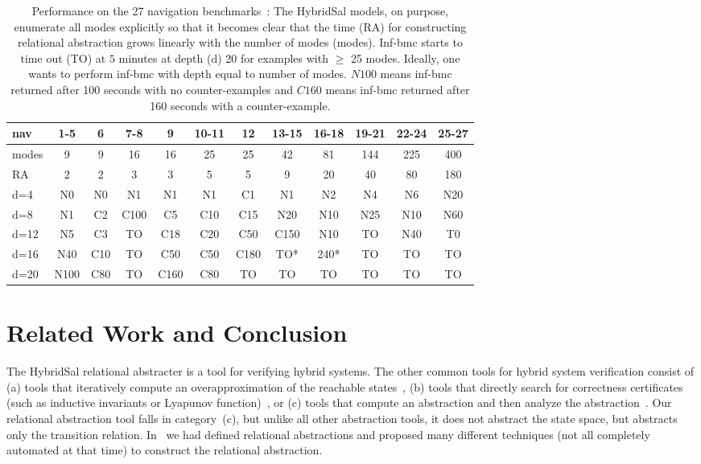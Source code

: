 \documentclass{llncs}
\begin{document}
\begin{table}[t]
\begin{center}
\small{
\begin{tabular}{||l|c|c|c|c|c|c|c|c|c|c|c||}
\hline
 nav & 1-5 & 6 & 7-8 & 9 & 10-11 & 12 & 13-15 & 16-18 & 19-21 & 22-24 & 25-27
\\ \hline \hline
modes & 9 & 9 & 16 & 16 & 25 & 25 & 42 & 81 & 144 & 225 & 400
\\
RA & 2 & 2 & 3 & 3 & 5 & 5 & 9 & 20 & 40 & 80 & 180
\\
d=4 & N0 & N0 & N1 & N1 & N1 & C1 & N1 & N2 & N4 & N6 & N20
\\
d=8 & N1 & C2 & C100 & C5 & C10 & C15 & N20 & N10 & N25 & N10 & N60
\\
d=12 & N5 & C3 & TO & C18 & C20 & C50 & C150 & N10 & TO & N40 & T0
\\
d=16 & N40 & C10 & TO & C50 & C50 & C180 & TO* & 240* & TO & TO & TO
\\
d=20 & N100 & C80 & TO & C160 & C80 & TO & TO & TO & TO & TO & TO
\\
\hline
\end{tabular}
}
\end{center}
\caption{Performance on the 27 navigation benchmarks~\cite{benchmarks}: The HybridSal
models, on purpose, enumerate all modes explicitly so that it
becomes clear that the time (RA) for constructing
relational abstraction grows linearly with the number of modes (modes).
Inf-bmc starts to time out (TO) at $5$ minutes at depth (d) 20 for
examples with $\geq$ 25 modes. Ideally, one wants to perform inf-bmc
with depth equal to number of modes. $N100$ means inf-bmc returned after
100 seconds with no counter-examples and $C160$ means inf-bmc returned
after 160 seconds with a counter-example.}\label{table}
\end{table}


%

\section{Related Work and Conclusion}

The HybridSal relational abstracter is a tool for verifying
hybrid systems.  The other common tools for hybrid
system verification consist of 
(a) tools that iteratively compute
an overapproximation of the reachable states~\cite{SpaceExsmall},
(b) tools that directly search for correctness certificates
(such as inductive invariants or Lyapunov function)~\cite{ST11:ISSACsmall},
or
(c) tools that compute an abstraction and then analyze
the abstraction~\cite{HybridSALsmall,AlurDangIvancic03:TACASsmall,Clarke03:TACASsmall}.
Our relational abstraction tool falls in category~(c), but unlike all
other abstraction tools, it does
not abstract the state space, but abstracts only the transition relation.
In~\cite{ST11:CAVsmall} we had defined relational abstractions and proposed
many different techniques (not all completely automated at that time)
to construct the relational abstraction.
 
\end{document}
